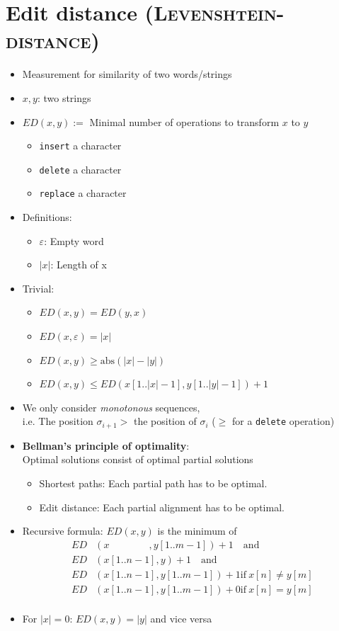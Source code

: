 \documentclass[12pt, a4paper]{scrartcl}
\begin{document}
\section{Edit distance (\textsc{Levenshtein-distance})}
\begin{itemize}
\item Measurement for similarity of two words/strings
\item $x,y$: two strings
\item $ED(x,y):=$ Minimal number of operations to transform $x$ to $y$
  \begin{itemize}
  \item \texttt{insert} a character
  \item \texttt{delete} a character
  \item \texttt{replace} a character
  \end{itemize}
\item Definitions:
  \begin{itemize}
  \item $\varepsilon$: Empty word
  \item $|x|$: Length of x
  \end{itemize}

\item Trivial:
  \begin{itemize}
  \item $ED(x,y)=ED(y,x)$
  \item $ED(x,\varepsilon)=|x|$
  \item $ED(x,y)\ge \mathrm{abs}(|x|-|y|)$
  \item $ED(x,y)\le ED(x[1..|x|-1],y[1..|y|-1]) + 1$
  \end{itemize}
\item We only consider \emph{monotonous} sequences, \\
  i.e. The position $\sigma_{i+1}>$ the position of $\sigma_i$ ($\ge$ for a \texttt{delete} operation)
\item \textbf{Bellman's principle of optimality}:\\
  Optimal solutions consist of optimal partial solutions
  \begin{itemize}
  \item Shortest paths: Each partial path has to be optimal.
  \item Edit distance: Each partial alignment has to be optimal.
  \end{itemize}
\item Recursive formula: $ED(x,y)$ is the minimum of
  \begin{align*}
   ED&(x\qquad\qquad,y[1..m-1])+1\quad\mathrm{and}\\
    ED&(x[1..n-1],y)+1\quad\mathrm{and}\\
    ED&(x[1..n-1],y[1..m-1])+1\mathrm{if\ }x[n]\ne y[m]\\
    ED&(x[1..n-1],y[1..m-1])+0\mathrm{if\ }x[n]= y[m]\\
  \end{align*}
\item For $|x|=0$: $ED(x,y)=|y|$ and vice versa

\end{itemize}%
\end{document}
